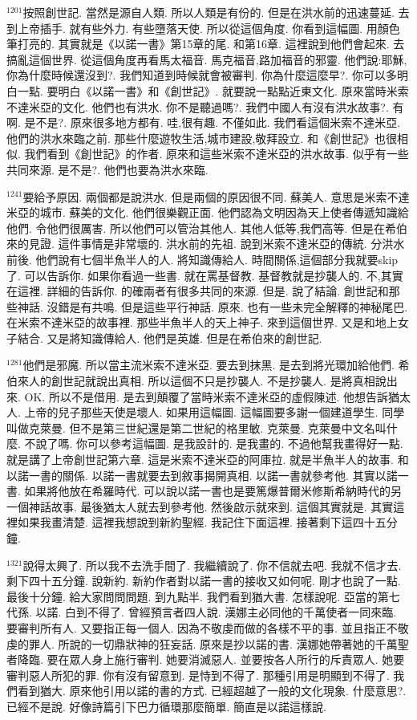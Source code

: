 \documentclass{book}
\begin{document}
$^{1201}$按照創世記.
當然是源自人類.
所以人類是有份的.
但是在洪水前的迅速蔓延.
去到上帝插手.
就有些外力.
有些墮落天使.
所以從這個角度.
你看到這幅圖.
用顏色筆打亮的.
其實就是《以諾一書》第15章的尾.
和第16章.
這裡說到他們會起來.
去搞亂這個世界.
從這個角度再看馬太福音.
馬克福音,路加福音的邪靈.
他們說:耶穌,你為什麼時候還沒到?.
我們知道到時候就會被審判.
你為什麼這麼早?.
你可以多明白一點.
要明白《以諾一書》和《創世記》.
就要說一點點近東文化.
原來當時米索不達米亞的文化.
他們也有洪水.
你不是聽過嗎?.
我們中國人有沒有洪水故事?.
有啊.
是不是?.
原來很多地方都有.
哇,很有趣.
不僅如此.
我們看這個米索不達米亞.
他們的洪水來臨之前.
那些什麼遊牧生活,城市建設,敬拜設立.
和《創世記》也很相似.
我們看到《創世記》的作者.
原來和這些米索不達米亞的洪水故事.
似乎有一些共同來源.
是不是?.
他們也要為洪水來臨.

$^{1241}$要給予原因.
兩個都是說洪水.
但是兩個的原因很不同.
蘇美人.
意思是米索不達米亞的城市.
蘇美的文化.
他們很樂觀正面.
他們認為文明因為天上使者傳遞知識給他們.
令他們很厲害.
所以他們可以管治其他人.
其他人低等,我們高等.
但是在希伯來的見證.
這件事情是非常壞的.
洪水前的先祖.
說到米索不達米亞的傳統.
分洪水前後.
他們說有七個半魚半人的人.
將知識傳給人.
時間關係,這個部分我就要skip了.
可以告訴你.
如果你看過一些書.
就在罵基督教.
基督教就是抄襲人的.
不,其實在這裡.
詳細的告訴你.
的確兩者有很多共同的來源.
但是.
說了結論.
創世記和那些神話.
沒錯是有共鳴.
但是這些平行神話.
原來.
也有一些未完全解釋的神秘尾巴.
在米索不達米亞的故事裡.
那些半魚半人的天上神子.
來到這個世界.
又是和地上女子結合.
又是將知識傳給人.
他們是英雄.
但是在希伯來的創世記.

$^{1281}$他們是邪魔.
所以當主流米索不達米亞.
要去到抹黑.
是去到將光環加給他們.
希伯來人的創世記就說出真相.
所以這個不只是抄襲人.
不是抄襲人.
是將真相說出來.
OK.
所以不是借用.
是去到顛覆了當時米索不達米亞的虛假陳述.
他想告訴猶太人.
上帝的兒子那些天使是壞人.
如果用這幅圖.
這幅圖要多謝一個建道學生.
同學叫做克萊曼.
但不是第三世紀還是第二世紀的格里敏.
克萊曼.
克萊曼中文名叫什麼.
不說了嗎.
你可以參考這幅圖.
是我設計的.
是我畫的.
不過他幫我畫得好一點.
就是講了上帝創世記第六章.
這是米索不達米亞的阿庫拉.
就是半魚半人的故事.
和以諾一書的關係.
以諾一書就要去到敘事揭開真相.
以諾一書就參考他.
其實以諾一書.
如果將他放在希羅時代.
可以說以諾一書也是要篤爆普爾米修斯希納時代的另一個神話故事.
最後猶太人就去到參考他.
然後啟示就來到.
這個其實就是.
其實這裡如果我畫清楚.
這裡我想說到新約聖經.
我記住下面這裡.
接著剩下這四十五分鐘.

$^{1321}$說得太興了.
所以我不去洗手間了.
我繼續說了.
你不信就去吧.
我就不信才去.
剩下四十五分鐘.
說新約.
新約作者對以諾一書的接收又如何呢.
剛才也說了一點.
最後十分鐘.
給大家問問問題.
到九點半.
我們看到猶大書.
怎樣說呢.
亞當的第七代孫.
以諾.
白到不得了.
曾經預言者四人說.
漢娜主必同他的千萬使者一同來臨.
要審判所有人.
又要指正每一個人.
因為不敬虔而做的各樣不平的事.
並且指正不敬虔的罪人.
所說的一切鼎狀神的狂妄話.
原來是抄以諾的書.
漢娜她帶著她的千萬聖者降臨.
要在眾人身上施行審判.
她要消滅惡人.
並要按各人所行的斥責眾人.
她要審判惡人所犯的罪.
你有沒有留意到.
是恃到不得了.
那種引用是明顯到不得了.
我們看到猶大.
原來他引用以諾的書的方式.
已經超越了一般的文化現象.
什麼意思?.
已經不是說.
好像詩篇引下巴力循環那麼簡單.
簡直是以諾這樣說.
\end{document}
